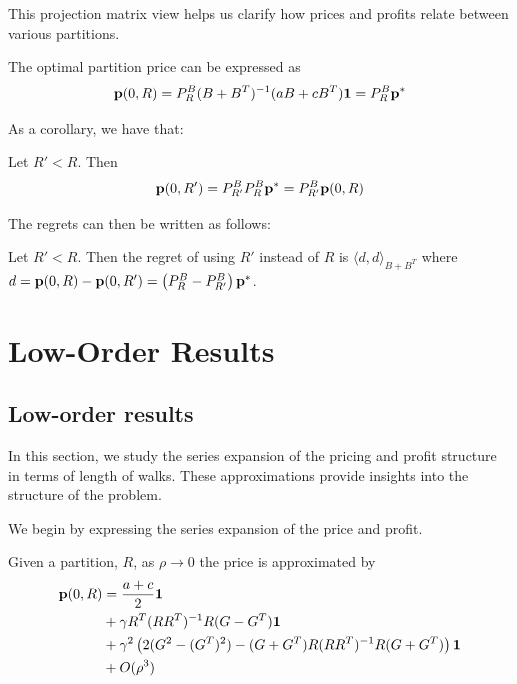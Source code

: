 This projection matrix view helps us clarify how prices and profits relate between various partitions. 
\begin{lemma}
    The optimal partition price can be expressed as 
    \[\mathbf{p}(0,R) = P_{R}^{B} (B+B^T)^{-1} (aB+cB^T) \mathbf{1} = P_{R}^{B} \mathbf{p}^*\]
\end{lemma}

As a corollary, we have that: 
\begin{corollary}
    Let $R' < R$. Then \[\mathbf{p}(0,R') = P_{R'}^{B} P_{R}^{B} \mathbf{p}^* = P_{R'}^{B} \mathbf{p}(0,R)\]
\end{corollary}

The regrets can then be written as follows: 
\begin{corollary}
    Let $R' < R$. Then the regret of using $R'$ instead of $R$ is $\langle d, d\rangle_{B+B^T}$ where $d = \mathbf{p}(0,R) - \mathbf{p}(0,R') = \left( P_{R}^{B} - P_{R'}^{B} \right) \mathbf{p}^*$.
\end{corollary}


\section{Low-Order Results}



\subsection{Low-order results}

In this section, we study the series expansion of the pricing and profit structure in terms of length of walks. These approximations provide insights into the structure of the problem. 

We begin by expressing the series expansion of the price and profit. 

\begin{theorem}
    Given a partition, $R$, as $\rho \to 0$ the price is approximated by 
    \begin{align*}
        \mathbf{p}(0,R) &= \frac{a+c}{2} \mathbf{1} \\ 
        &+ \gamma R^T (RR^T)^{-1} R (G-G^T) \mathbf{1} \\ 
        &+ \gamma^2 \left( 2 (G^2 - (G^T)^2) - (G+G^T) R (RR^T)^{-1} R (G+G^T) \right)\mathbf{1} \\
        &+ O(\rho^3 )
    \end{align*}
\end{theorem}



